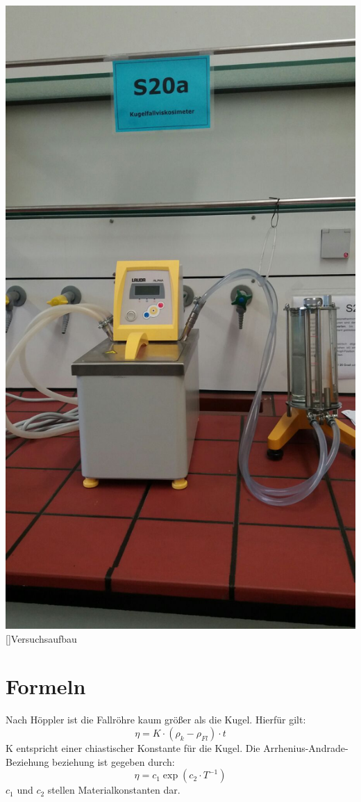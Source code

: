 \documentclass[12pt,a4paper,]{scrreprt}
\begin{document}
\begin{center}
	\includegraphics[scale=0.27]{aufbau.jpeg}
	[]{Versuchsaufbau}
\end{center}

	
\pagebreak

	\chapter{Formeln}
Nach Höppler ist die Fallröhre kaum größer als die Kugel. Hierfür gilt:\\
\begin{equation}
\eta= K\cdot(\rho_k - \rho_{Fl})\cdot t 
\end{equation}
K entspricht einer chiastischer Konstante für die Kugel.
Die Arrhenius-Andrade-Beziehung beziehung ist gegeben durch: \\
\begin{equation}
\eta =c_1 \exp (c_2 \cdot T^{-1})
\end{equation}
$c_1$ und $c_2$ stellen Materialkonstanten dar.
	
\end{document}
